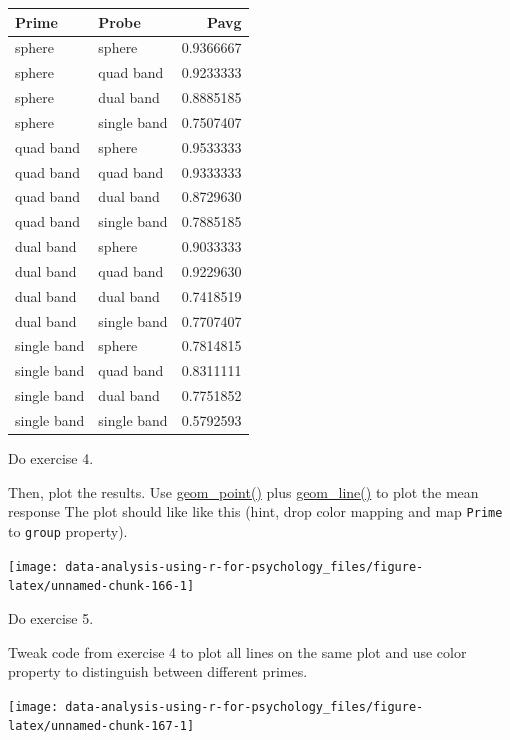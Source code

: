 \documentclass[
]{book}
\begin{document}
\begin{tabular}{l|l|r}
\hline
Prime & Probe & Pavg\\
\hline
sphere & sphere & 0.9366667\\
\hline
sphere & quad band & 0.9233333\\
\hline
sphere & dual band & 0.8885185\\
\hline
sphere & single band & 0.7507407\\
\hline
quad band & sphere & 0.9533333\\
\hline
quad band & quad band & 0.9333333\\
\hline
quad band & dual band & 0.8729630\\
\hline
quad band & single band & 0.7885185\\
\hline
dual band & sphere & 0.9033333\\
\hline
dual band & quad band & 0.9229630\\
\hline
dual band & dual band & 0.7418519\\
\hline
dual band & single band & 0.7707407\\
\hline
single band & sphere & 0.7814815\\
\hline
single band & quad band & 0.8311111\\
\hline
single band & dual band & 0.7751852\\
\hline
single band & single band & 0.5792593\\
\hline
\end{tabular}

Do exercise 4.

Then, plot the results. Use \href{https://ggplot2.tidyverse.org/reference/geom_point.html}{geom\_point()} plus \href{https://ggplot2.tidyverse.org/reference/geom_path.html}{geom\_line()} to plot the mean response The plot should like like this (hint, drop color mapping and map \texttt{Prime} to \texttt{group} property).

\begin{center}\texttt{[image: data-analysis-using-r-for-psychology\_files/figure-latex/unnamed-chunk-166-1]} \end{center}

Do exercise 5.

Tweak code from exercise 4 to plot all lines on the same plot and use color property to distinguish between different primes.

\begin{center}\texttt{[image: data-analysis-using-r-for-psychology\_files/figure-latex/unnamed-chunk-167-1]} \end{center}
\end{document}

